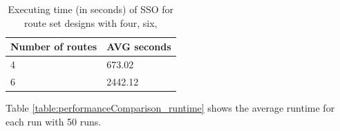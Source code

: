 \begin{table}[H]
    \centering
    \begin{tabular}{|l||l|}
    \hline
    Number of routes & AVG seconds\\
    \hline
    4 & 673.02 \\
    6 & 2442.12  \\
    \hline
    \end{tabular}
    \caption {Executing time (in seconds) of SSO for route set designs with four, six, }
    \label{table:performanceComparison_runtime}
\end{table}

Table \vref{table:performanceComparison_runtime} shows the average runtime for each run with 50 runs.

